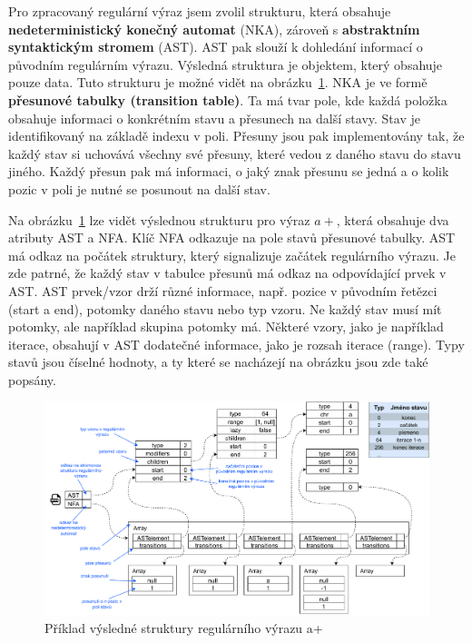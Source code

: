 Pro zpracovaný regulární výraz jsem zvolil strukturu, která obsahuje \textbf{nedeterministický konečný automat} (NKA), zároveň s \textbf{abstraktním syntaktickým stromem} (AST).
AST pak slouží k dohledání informací o původním regulárním výrazu. 
Výsledná struktura je objektem, který obsahuje pouze data.
Tuto strukturu je možné vidět na obrázku~\ref{fig:JSONex}.
NKA je ve formě \textbf{přesunové tabulky (transition table)}. 
Ta má tvar pole, kde každá položka obsahuje informaci o konkrétním stavu a přesunech na další stavy.
Stav je identifikovaný na základě indexu v poli. 
Přesuny jsou pak implementovány tak, že každý stav si uchovává všechny své přesuny, které vedou z daného stavu do stavu jiného.
Každý přesun pak má informaci, o jaký znak přesunu se jedná a o kolik pozic v poli je nutné se posunout na další stav. 

Na obrázku~\ref{fig:JSONex} lze vidět výslednou strukturu pro výraz $a+$, která obsahuje dva atributy AST a NFA.
Klíč NFA odkazuje na pole stavů přesunové tabulky. 
AST má odkaz na počátek struktury, který signalizuje začátek regulárního výrazu.
Je zde patrné, že každý stav v tabulce přesunů má odkaz na odpovídající prvek v AST. 
AST prvek/vzor drží různé informace, např. pozice v původním řetězci (start a end), 
potomky daného stavu nebo typ vzoru. 
Ne každý stav musí mít potomky, ale například skupina potomky má.
Některé vzory, jako je například iterace, obsahují v AST dodatečné informace, jako je rozsah iterace (range).
Typy stavů jsou číselné hodnoty, a ty které se nacházejí na obrázku jsou zde také popsány.

\begin{figure}[!h]
	\centering
	\includegraphics[width=1\textwidth]{Figures/BP-JSON.pdf}
	\caption{Příklad výsledné struktury regulárního výrazu a+}
	\label{fig:JSONex}
\end{figure}

